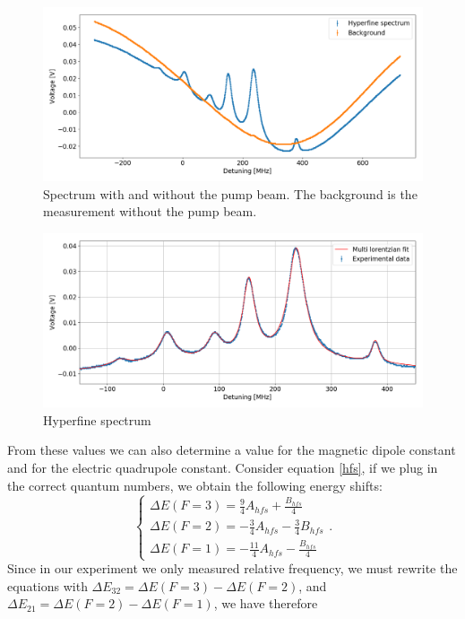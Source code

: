 \documentclass[a4paper,10pt]{article}
\begin{document}
\begin{figure}[H]
    \centering
     \includegraphics[width=\textwidth]{spectrum.png}
    \caption{Spectrum with and without the pump beam. The background is the measurement without the pump beam.}\label{broadenedspectrum}
\end{figure}
\begin{figure}[H]
    \centering
     \includegraphics[width=\textwidth]{hyperfinespectrum.png}
    \caption{Hyperfine spectrum}\label{hyperfinespectrum}
\end{figure}
From these values we can also determine a value for the magnetic dipole constant and for the electric quadrupole constant. Consider equation \eqref{hfs}, if we plug in the correct quantum numbers, we obtain the following energy shifts:
\begin{equation}\begin{cases}
\Delta E(F=3) = \frac{9}{4}A_{hfs} + \frac{B_{hfs}}{4}\\
\Delta E(F=2) = -\frac{3}{4}A_{hfs} - \frac{3}{4}B_{hfs}\\
\Delta E(F=1) = -\frac{11}{4}A_{hfs} - \frac{B_{hfs}}{4}
\end{cases}.\end{equation}
Since in our experiment we only measured relative frequency, we must rewrite the equations with $\Delta E_{32} = \Delta E(F=3) - \Delta E(F=2)$, and $\Delta E_{21}=\Delta E(F=2)-\Delta E(F=1)$, we have therefore
\end{document}
